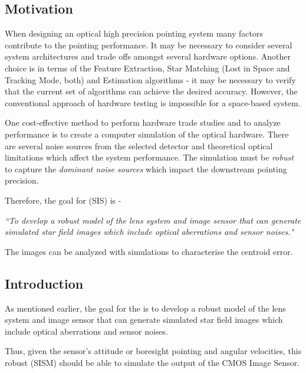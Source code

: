 \documentclass[../../main.tex]{subfiles}
\begin{document}

\subsection{Motivation} %
When designing an optical high precision pointing system many factors contribute to the pointing performance. It may be necessary to consider several system architectures and trade offs amongst several hardware options. Another choice is in terms of the Feature Extraction, Star Matching (Lost in Space and Tracking Mode, both) and Estimation algorithms - it may be necessary to verify that the current set of algorithms can achieve the desired accuracy. However, the conventional approach of hardware testing is impossible for a space-based system. 

One cost-effective method to perform hardware trade studies and to analyze performance is to create a computer simulation of the optical hardware. There are several noise sources from the selected detector and theoretical optical limitations which affect the system performance. The simulation must be \emph{robust} to capture the \emph{dominant noise sources} which impact the downstream pointing precision. 

Therefore, the goal for \SIS (SIS) is -
\begin{displayquote}
    \emph{``To develop a robust model of the lens system and image sensor that can generate simulated star field images which include optical aberrations and sensor noises."}
\end{displayquote}
The images can be analyzed with simulations to characterise the centroid error.


\subsection{Introduction} %

As mentioned earlier, the goal for the \SIS is to develop a robust model of the lens system and image sensor that can generate simulated star field images which include optical aberrations and sensor noises. 

Thus, given the sensor's attitude or boresight pointing and angular velocities, this robust \SISM (SISM) should be able to simulate the output of the CMOS Image Sensor. 

\end{document}
